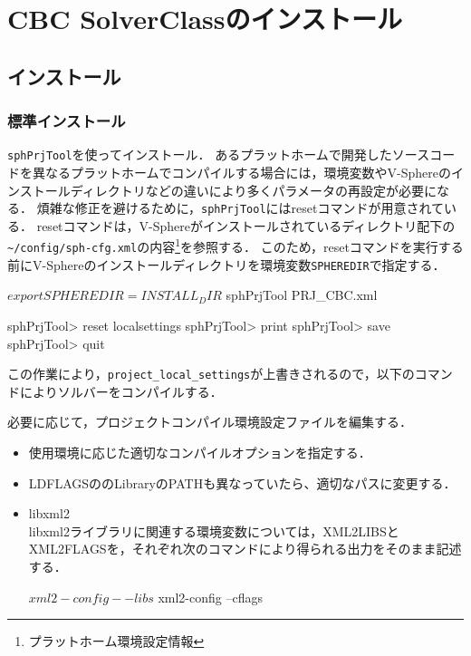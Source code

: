 \section{CBC SolverClassのインストール}

%
\subsection{インストール}

%
\subsubsection{標準インストール}
\verb|sphPrjTool|を使ってインストール．
あるプラットホームで開発したソースコードを異なるプラットホームでコンパイルする場合には，環境変数やV-Sphereのインストールディレクトリなどの違いにより多くパラメータの再設定が必要になる．
煩雑な修正を避けるために，\verb|sphPrjTool|にはresetコマンドが用意されている．
resetコマンドは，V-Sphereがインストールされているディレクトリ配下の\verb|~/config/sph-cfg.xml|の内容\footnote{プラットホーム環境設定情報}を参照する．
このため，resetコマンドを実行する前にV-Sphereのインストールディレクトリを環境変数\verb|SPHEREDIR|で指定する．

{\small
\begin{program}
$ export SPHEREDIR=INSTALL_DIR
$ sphPrjTool PRJ_CBC.xml

sphPrjTool> reset localsettings
sphPrjTool> print
sphPrjTool> save
sphPrjTool> quit
\end{program}
}

この作業により，\verb|project_local_settings|が上書きされるので，以下のコマンドによりソルバーをコンパイルする．
{\small
{}
}

必要に応じて，プロジェクトコンパイル環境設定ファイルを編集する．
\begin{itemize}
\item 使用環境に応じた適切なコンパイルオプションを指定する．
\item LDFLAGSののLibraryのPATHも異なっていたら、適切なパスに変更する．
\item libxml2\\
libxml2ライブラリに関連する環境変数については，XML2LIBSとXML2FLAGSを，それぞれ次のコマンドにより得られる出力をそのまま記述する．

{\small
\begin{program}
$ xml2-config --libs
$ xml2-config --cflags
\end{program}
}

\end{itemize}


